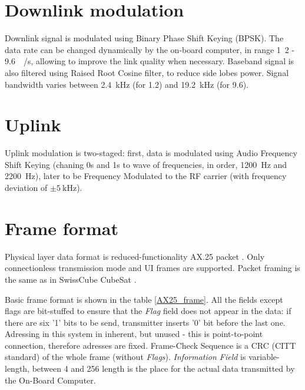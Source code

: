 \section{Downlink modulation}
Downlink signal is modulated using Binary Phase Shift Keying (BPSK). The data rate can be changed dynamically by the on-board computer, in range \si{1.2} - \SI{9.6}{\kilo\bit / \second}, allowing to improve the link quality when necessary. Baseband signal is also filtered using Raised Root Cosine filter, to reduce side lobes power. Signal bandwidth varies between \SI{2.4}{\kHz} (for \SI{1.2}{\kbps}) and \SI{19.2}{\kHz} (for \SI{9.6}{\kbps}). 


\section{Uplink}
Uplink modulation is two-staged: first, data is modulated using Audio Frequency Shift Keying (chaning 0s and 1s to wave of frequencies, in order, \SI{1200}{\hertz} and \SI{2200}{\hertz}), later to be Frequency Modulated to the RF carrier (with frequency deviation of $\pm\SI{5}{\kilo\hertz}$).


\section{Frame format}
Physical layer data format is reduced-functionality AX.25 packet \cite{AX25_standard}. Only connectionless transmission mode and UI frames are supported. Packet framing is the same as in SwissCube CubeSat \cite{SwissCube_AX25}.

Basic frame format is shown in the table \ref{AX25_frame}. All the fields except flags are bit-stuffed to ensure that the \textit{Flag} field does not appear in the data: if there are six '1' bits to be send, transmitter inserts '0' bit before the last one. Adressing in this system in inherent, but unused - this is point-to-point connection, therefore adresses are fixed. Frame-Check Sequence is a CRC (CITT standard) of the whole frame (without \textit{Flags}). \textit{Information Field} is variable-length, between \si{4} and \SI{256}{\byte} length is the place for the actual data transmitted by the On-Board Computer.

